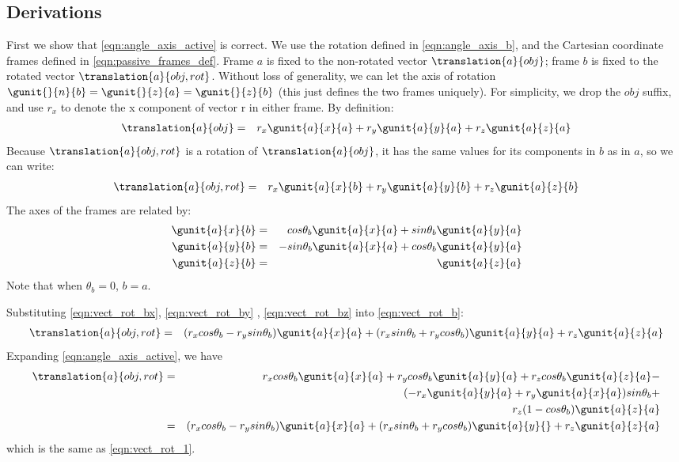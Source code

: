 \documentclass{book}
\numberwithin{equation}{subsection}
\begin{document}
\subsection {Derivations}
First we show that \ref{eqn:angle_axis_active} is correct. We use the
rotation defined in \ref{eqn:angle_axis_b}, and the Cartesian
coordinate frames defined in \ref{eqn:passive_frames_def}. Frame $a$
is fixed to the non-rotated vector ${\translation{a}{obj}}$; frame $b$
is fixed to the rotated vector ${\translation{a}{obj,rot}}$. Without
loss of generality, we can let the axis of rotation $\gunit{}{n}{b} =
\gunit{}{z}{a} = \gunit{}{z}{b}$ (this just defines the two frames
uniquely). For simplicity, we drop the $obj$ suffix, and use $r_x$ to
denote the x component of vector r in either frame. By definition:
\begin{eqnarray}
{\translation{a}{obj}} &=& r_x \gunit{a}{x}{a} + r_y \gunit{a}{y}{a} + r_z \gunit{a}{z}{a}
\end{eqnarray}
Because ${\translation{a}{obj,rot}}$ is a rotation of
${\translation{a}{obj}}$, it has the same values for its components in
$b$ as in $a$, so we can write:
\begin{eqnarray}
{\translation{a}{obj,rot}} &=& r_x \gunit{a}{x}{b} + r_y \gunit{a}{y}{b} + r_z \gunit{a}{z}{b} \label{eqn:vect_rot_b}
\end{eqnarray}
The axes of the frames are related by:
\begin{eqnarray}
\gunit{a}{x}{b} &=& cos \theta_b \gunit{a}{x}{a} + sin \theta_b \gunit{a}{y}{a} \label{eqn:vect_rot_bx} \\
\gunit{a}{y}{b} &=& - sin \theta_b \gunit{a}{x}{a} + cos \theta_b \gunit{a}{y}{a} \label{eqn:vect_rot_by} \\
\gunit{a}{z}{b} &=& \gunit{a}{z}{a} \label{eqn:vect_rot_bz}
\end{eqnarray}
Note that when $\theta_b = 0$, $b = a$.

Substituting \ref{eqn:vect_rot_bx}, \ref{eqn:vect_rot_by} , \ref{eqn:vect_rot_bz} into \ref{eqn:vect_rot_b}:
\begin{eqnarray}
{\translation{a}{obj,rot}} &=& (r_x cos \theta_b - r_y sin \theta_b)
\gunit{a}{x}{a} + (r_x sin \theta_b + r_y cos \theta_b) \gunit{a}{y}{a}
+ r_z \gunit{a}{z}{a} \label{eqn:vect_rot_1} \nonumber \\
\end{eqnarray}
Expanding \ref{eqn:angle_axis_active}, we have
\begin{eqnarray}
{\translation{a}{obj,rot}} &=& r_x cos \theta_b \gunit{a}{x}{a} + r_y cos \theta_b \gunit{a}{y}{a} + r_z cos \theta_b \gunit{a}{z}{a} - \\
        & & (- r_x \gunit{a}{y}{a} + r_y \gunit{a}{x}{a}) sin \theta_b + \nonumber \\
        & & r_z (1 - cos \theta_b) \gunit{a}{z}{a} \nonumber \\
        &=& (r_x cos \theta_b - r_y sin \theta_b) \gunit{a}{x}{a} + 
(r_x sin \theta_b + r_y cos \theta_b) \gunit{a}{y}{} + r_z \gunit{a}{z}{a}\nonumber \\
\end{eqnarray}
which is the same as \ref{eqn:vect_rot_1}.
\end{document}
